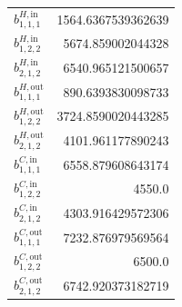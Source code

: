 \documentclass{article}%
\begin{document}
\begin{multicols*}{3}
\begin{supertabular}{lr}
	$b_{1,1,1}^{H,\text{in}}$ & 1564.6367539362639 \\%
	$b_{1,2,2}^{H,\text{in}}$ & 5674.859002044328 \\%
	$b_{2,1,2}^{H,\text{in}}$ & 6540.965121500657 \\%
	$b_{1,1,1}^{H,\text{out}}$ & 890.6393830098733 \\%
	$b_{1,2,2}^{H,\text{out}}$ & 3724.8590020443285 \\%
	$b_{2,1,2}^{H,\text{out}}$ & 4101.961177890243 \\%
	$b_{1,1,1}^{C,\text{in}}$ & 6558.879608643174 \\%
	$b_{1,2,2}^{C,\text{in}}$ & 4550.0 \\%
	$b_{2,1,2}^{C,\text{in}}$ & 4303.916429572306 \\%
	$b_{1,1,1}^{C,\text{out}}$ & 7232.876979569564 \\%
	$b_{1,2,2}^{C,\text{out}}$ & 6500.0 \\%
	$b_{2,1,2}^{C,\text{out}}$ & 6742.920373182719 \\%
\end{supertabular}%
\end{multicols*}%
\clearpage%
\end{document}
